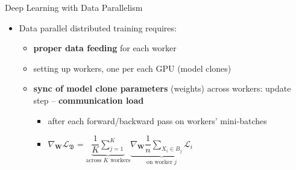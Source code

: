\begin{frame}{Deep Learning with Data Parallelism}
\protect\hypertarget{deep-learning-with-data-parallelism-7}{}

\begin{itemize}
\tightlist
\item
  Data parallel distributed training requires:

  \begin{itemize}
  \tightlist
  \item
    \textbf{proper data feeding} for each worker
  \item
    setting up workers, one per each GPU (model clones)
  \item
    \textbf{sync of model clone parameters} (weights) across workers:
    update step -- \textbf{communication load}

    \begin{itemize}
    \tightlist
    \item
      after each forward/backward pass on workers' mini-batches
    \item
      \(\nabla_\mathbf{W} \mathcal{L}_{\mathfrak{B}} = {\displaystyle \underbrace{\dfrac{1}{K} \sum_{j = 1}^{K}}_{\text{across } K \text{ workers}} } \underbrace{\nabla_\mathbf{W} \dfrac{1}{n} {\displaystyle \sum_{X_i \in B_j} \mathcal{L}_i}}_{\text{on worker } j}\)
    \end{itemize}
  \end{itemize}
\end{itemize}

\vspace*{-1.5cm}

\end{frame}

